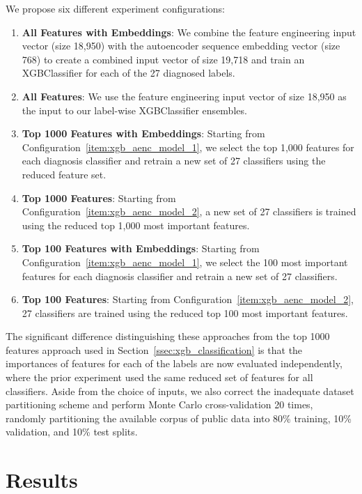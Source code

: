 \documentclass[\main/thesis.tex]{subfiles}
\begin{document}
We propose six different experiment configurations:
\begin{enumerate}
    \item \label{item:xgb_aenc_model_1} \textbf{All Features with Embeddings}: We combine the feature engineering input vector (size 18,950) with the autoencoder sequence embedding vector (size 768) to create a combined input vector of size 19,718 and train an XGBClassifier for each of the 27 diagnosed labels.
    \item \label{item:xgb_aenc_model_2} \textbf{All Features}: We use the feature engineering input vector of size 18,950 as the input to our label-wise XGBClassifier ensembles.
    \item \textbf{Top 1000 Features with Embeddings}: Starting from Configuration~\ref{item:xgb_aenc_model_1}, we select the top 1,000 features for each diagnosis classifier and retrain a new set of 27 classifiers using the reduced feature set.
    \item \textbf{Top 1000 Features}: Starting from Configuration~\ref{item:xgb_aenc_model_2}, a new set of 27 classifiers is trained using the reduced top 1,000 most important features.
    \item \textbf{Top 100 Features with Embeddings}: Starting from Configuration~\ref{item:xgb_aenc_model_1}, we select the 100 most important features for each diagnosis classifier and retrain a new set of 27 classifiers.
    \item \textbf{Top 100 Features}: Starting from Configuration~\ref{item:xgb_aenc_model_2}, 27 classifiers are trained using the reduced top 100 most important features.
\end{enumerate}

The significant difference distinguishing these approaches from the top 1000 features approach used in Section~\ref{ssec:xgb_classification} is that the importances of features for each of the labels are now evaluated independently, where the prior experiment used the same reduced set of features for all classifiers.
Aside from the choice of inputs, we also correct the inadequate dataset partitioning scheme and perform Monte Carlo cross-validation 20 times, randomly partitioning the available corpus of public data into 80\% training, 10\% validation, and 10\% test splits.

\section{Results}
\end{document}
